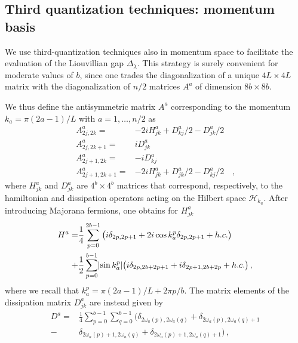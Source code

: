 \subsection{Third quantization techniques: momentum basis}
\label{sec_app_third_quantization_momentum_basis}

We use third-quantization techniques also in momentum space to facilitate the evaluation of the Liouvillian gap $\Delta_\lambda$. This strategy is surely convenient for moderate values of $b$, since one trades the diagonalization of a unique $4L \times 4L$ matrix with the diagonalization of $n/2$ matrices $A^a$ of dimension $8b \times 8b$.

We thus define the antisymmetric matrix $A^a$ corresponding to the momentum $k_a=\pi(2a-1)/L$ with $a=1,\dots,n/2$ as
\begin{equation}
\begin{aligned}
    A^a_{2j,2k}=&-2i H^a_{jk}+D^a_{kj}/2-D^a_{jk}/2\\
    A^a_{2j,2k+1}=&iD^a_{jk}\\
    A^a_{2j+1,2k}=&-iD^a_{kj}\\
    A^a_{2j+1,2k+1}=&-2iH^a_{jk}+D^a_{jk}/2-D^a_{kj}/2&\,,
\end{aligned}
\label{eq_A_third_quantization_momentum_basis}
\end{equation}
where $H^a_{jk}$ and $D^a_{jk}$ are $4^b \times 4^b$ matrices that correspond, respectively, to the hamiltonian and dissipation operators acting on the Hilbert space $\mathcal{H}_{k_a}$. After introducing Majorana fermions, one obtains for $H^a_{jk}$
\begin{equation}
\begin{aligned}
    H^a=&\frac{1}{4}\sum_{p=0}^{2b-1}\big(i\delta_{2p,2p+1}+2i\cos{k_a^p}\delta_{2p,2p+1}+h.c.\big)\\
    +&\frac{1}{2}\sum_{p=0}^{b-1}\lvert\sin{k_a^p}\rvert\big(i\delta_{2p,2b+2p+1}+i\delta_{2p+1,2b+2p}+h.c.\big)\,,
\end{aligned}
\label{eq_def_Hamiltonian_third_quantization_momentum_space}
\end{equation}
where we recall that $k^p_a=\pi(2a-1)/L+2\pi p/b$. The matrix elements of the dissipation matrix $D^a_{jk}$ are instead given by
\begin{equation}
\begin{aligned}
    D^a=&\frac{1}{4}\sum_{p=0}^{b-1}\sum_{q=0}^{b-1}\big(\delta_{2\omega_a(p),2\omega_a(q)}+\delta_{2\omega_a(p),2\omega_a(q)+1}\\
-&\delta_{2\omega_a(p)+1,2\omega_a(q)}+\delta_{2\omega_a(p)+1,2\omega_a(q)+1}\big)\,,
\end{aligned}
    \label{eq_dissipation_third_quantization_momentum}
\end{equation}
